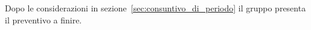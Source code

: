 \documentclass[../piano-di-progetto.tex]{subfiles}
\begin{document}
Dopo le considerazioni in sezione~\ref{sec:consuntivo_di_periodo} il gruppo presenta il preventivo a finire.
\end{document}
